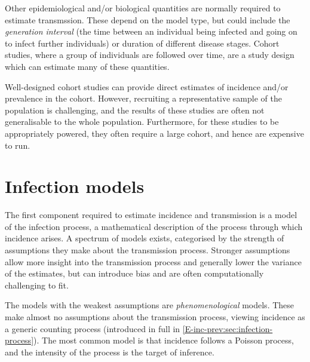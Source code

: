 \documentclass[thesis.tex]{subfiles}
\begin{document}
Other epidemiological and/or biological quantities are normally required to estimate transmssion.
These depend on the model type, but could include the \emph{generation interval} (the time between an individual being infected and going on to infect further individuals) or duration of different disease stages.
Cohort studies, where a group of individuals are followed over time, are a study design which can estimate many of these quantities.

Well-designed cohort studies can provide direct estimates of incidence and/or prevalence in the cohort.
However, recruiting a representative sample of the population is challenging, and the results of these studies are often not generalisable to the whole population.
Furthermore, for these studies to be appropriately powered, they often require a large cohort, and hence are expensive to run.

\section{Infection models}

The first component required to estimate incidence and transmission is a model of the infection process, a mathematical description of the process through which incidence arises.
A spectrum of models exists, categorised by the strength of assumptions they make about the transmission process.
Stronger assumptions allow more insight into the transmission process and generally lower the variance of the estimates, but can introduce bias and are often computationally challenging to fit.

The models with the weakest assumptions are \emph{phenomenological} models.
These make almost no assumptions about the transmission process, viewing incidence as a generic counting process (introduced in full in \cref{E-inc-prev:sec:infection-process}).
The most common model is that incidence follows a Poisson process, and the intensity of the process is the target of inference.
\end{document}
